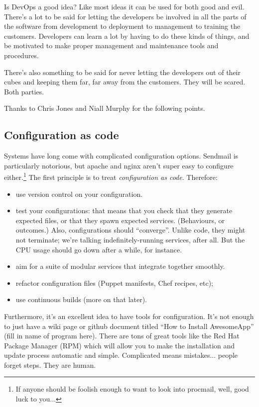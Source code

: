 \documentclass[a4paper]{report}
\begin{document}
Is DevOps a good idea? Like most ideas it can be used for both good and evil. There's a lot to be said for letting the developers be involved in all the parts of the software from development to deployment to management to training the customers. Developers can learn a lot by having to do these kinds of things, and be motivated to make proper management and maintenance tools and procedures. 

There's also something to be said for never letting the developers out of their cubes and keeping them far, far away from the customers. They will be scared. Both parties.

Thanks to Chris Jones and Niall Murphy for the following points.

\subsection*{Configuration as code}
Systems have long come with complicated configuration options.
Sendmail is particularly notorious, but apache and nginx aren't super
easy to configure either.\footnote{If anyone should be foolish enough to want to look into procmail, well, good luck to you...} The first principle is to treat \emph{configuration as code}.
Therefore:
\begin{itemize}
\item use version control on your configuration.
\item test your configurations: that means that you check that they
  generate expected files, or that they spawn expected
  services. (Behaviours, or outcomes.) Also, configurations should
  ``converge''. Unlike code, they might not terminate; we're talking
  indefinitely-running services, after all. But the CPU usage should
  go down after a while, for instance.
\item aim for a suite of modular services that integrate together smoothly.
\item refactor configuration files (Puppet manifests, Chef recipes, etc);
\item use continuous builds (more on that later).
\end{itemize}

Furthermore, it's an excellent idea to have tools for configuration. It's not enough to just have a wiki page or github document titled ``How to Install AwesomeApp'' (fill in name of program here). There are tons of great tools like the Red Hat Package Manager (RPM) which will allow you to make the installation and update process automatic and simple. Complicated means mistakes... people forget steps. They are human. 
\end{document}
